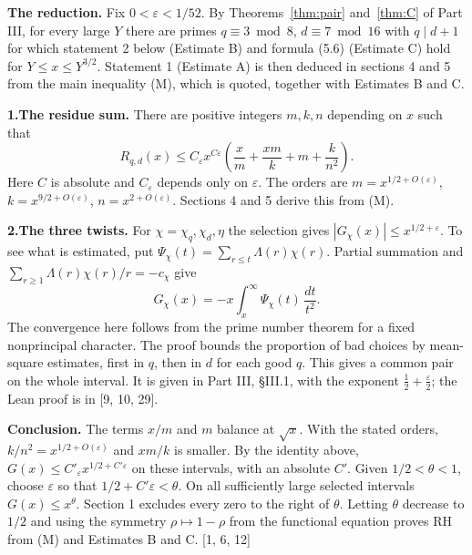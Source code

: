 \documentclass[11pt,letterpaper]{article}
\begin{document}
{\textbf{The reduction.} Fix $0<\varepsilon<1/52$. By Theorems~\ref{thm:pair} and~\ref{thm:C} of Part III, for every large $Y$ there are primes $q\equiv3\bmod8$, $d\equiv7\bmod16$ with $q\mid d+1$ for which statement 2 below (Estimate B) and formula (5.6) (Estimate C) hold for $Y\le x\le Y^{3/2}$. Statement 1 (Estimate A) is then deduced in sections 4 and 5 from the main inequality (M), which is quoted, together with Estimates B and C.

\par\noindent\textbf{1.}\enspace \textbf{The residue sum.} There are positive integers $m,k,n$ depending on $x$ such that
\begin{equation}\label{D:47}
    R_{q,d}(x)\le C_\varepsilon x^{C\varepsilon}
            \left(\frac{x}{m}+\frac{xm}{k}+m+\frac{k}{n^2}\right). \tag{A}
\end{equation}
   Here $C$ is absolute and $C_\varepsilon$ depends only on $\varepsilon$. The orders are $m=x^{1/2+O(\varepsilon)}$, $k=x^{9/2+O(\varepsilon)}$, $n=x^{2+O(\varepsilon)}$. Sections 4 and 5 derive this from (M).
\par\noindent\textbf{2.}\enspace \textbf{The three twists.} For $\chi=\chi_q,\chi_d,\eta$ the selection gives $|G_\chi(x)|\le x^{1/2+\varepsilon}$. To see what is estimated, put $\Psi_\chi(t)=\sum_{r\le t}\Lambda(r)\chi(r)$. Partial summation and $\sum_{r\ge1}\Lambda(r)\chi(r)/r=-c_\chi$ give
\begin{equation}\label{D:48}
     G_\chi(x)=-x\int_x^\infty \Psi_\chi(t)\,\frac{dt}{t^2}.
\end{equation}
   The convergence here follows from the prime number theorem for a fixed nonprincipal character. The proof bounds the proportion of bad choices by mean-square estimates, first in $q$, then in $d$ for each good $q$. This gives a common pair on the whole interval. It is given in Part III, \S III.1, with the exponent $\frac12+\frac\varepsilon2$; the Lean proof is in [9, 10, 29].

\textbf{Conclusion.} The terms $x/m$ and $m$ balance at $\sqrt{x}$. With the stated orders, $k/n^2=x^{1/2+O(\varepsilon)}$ and $xm/k$ is smaller. By the identity above, $G(x)\le C'_\varepsilon x^{1/2+C'\varepsilon}$ on these intervals, with an absolute $C'$. Given $1/2<\theta<1$, choose $\varepsilon$ so that $1/2+C'\varepsilon<\theta$. On all sufficiently large selected intervals $G(x)\le x^\theta$. Section 1 excludes every zero to the right of $\theta$. Letting $\theta$ decrease to $1/2$ and using the symmetry $\rho\mapsto1-\rho$ from the functional equation proves RH from (M) and Estimates B and C. [1, 6, 12]

}
\end{document}
